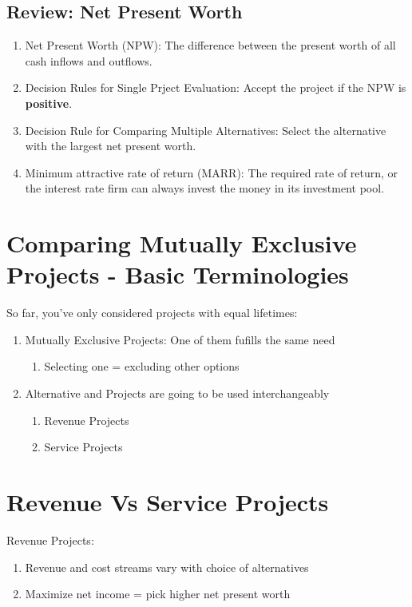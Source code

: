 \documentclass{report} %
\begin{document}
\subsection*{Review: Net Present Worth}
\begin{enumerate}
    \item Net Present Worth (NPW): The difference between the present worth of all cash inflows and outflows.
    \item Decision Rules for Single Prject Evaluation: Accept the project if the NPW is \textbf{positive}.
    \item Decision Rule for Comparing Multiple Alternatives: Select the alternative with the largest net present worth.
    \item Minimum attractive rate of return (MARR): The required rate of return, or the interest rate firm can always invest the money in its investment pool.
\end{enumerate}

\section*{Comparing Mutually Exclusive Projects - Basic Terminologies}
So far, you've only considered projects with equal lifetimes:
\begin{enumerate}
    \item Mutually Exclusive Projects: One of them fufills the same need
    \begin{enumerate}
        \item Selecting one = excluding other options
    \end{enumerate}
    \item Alternative and Projects are going to be used interchangeably
    \begin{enumerate}
        \item Revenue Projects
        \item Service Projects
    \end{enumerate}
\end{enumerate}

\section*{Revenue Vs Service Projects}

Revenue Projects:
\begin{enumerate}
    \item Revenue and cost streams vary with choice of alternatives
    \item Maximize net income = pick higher net present worth
\end{enumerate}
\end{document}
